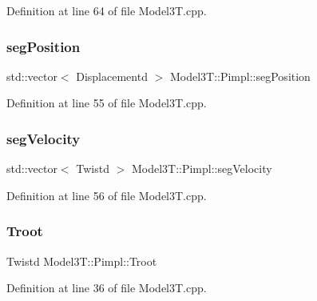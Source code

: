 Definition at line 64 of file Model3\+T.\+cpp.

\hypertarget{structModel3T_1_1Pimpl_a95a2564c9002bdb208279d591fca70ad}{}\label{structModel3T_1_1Pimpl_a95a2564c9002bdb208279d591fca70ad} 
\subsubsection{\texorpdfstring{seg\+Position}{segPosition}}
{\footnotesize\ttfamily std\+::vector$<$ Displacementd $>$ Model3\+T\+::\+Pimpl\+::seg\+Position}



Definition at line 55 of file Model3\+T.\+cpp.

\hypertarget{structModel3T_1_1Pimpl_a53fc477028c2bc87ee7c5e04879e8c20}{}\label{structModel3T_1_1Pimpl_a53fc477028c2bc87ee7c5e04879e8c20} 
\subsubsection{\texorpdfstring{seg\+Velocity}{segVelocity}}
{\footnotesize\ttfamily std\+::vector$<$ Twistd $>$ Model3\+T\+::\+Pimpl\+::seg\+Velocity}



Definition at line 56 of file Model3\+T.\+cpp.

\hypertarget{structModel3T_1_1Pimpl_a5b282557f05769af0f2e60709d348a43}{}\label{structModel3T_1_1Pimpl_a5b282557f05769af0f2e60709d348a43} 
\subsubsection{\texorpdfstring{Troot}{Troot}}
{\footnotesize\ttfamily Twistd Model3\+T\+::\+Pimpl\+::\+Troot}



Definition at line 36 of file Model3\+T.\+cpp.

\hypertarget{structModel3T_1_1Pimpl_a3b3b41e690971ea00156bdfefb813a5c}{}\label{structModel3T_1_1Pimpl_a3b3b41e690971ea00156bdfefb813a5c} 
